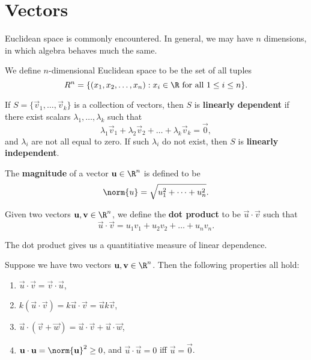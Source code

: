 \section{Vectors}
Euclidean space is commonly encountered. In general, we may have $n$ dimensions, in which algebra behaves much the same.
 \begin{definition}
  We define $n$-dimensional Euclidean space to be the set of all tuples \[
    R^n = \{(x_1, x_2, \dots, x_n) : x_i \in \R\ \text{for all}\ 1 \le i \le n\}
  .\] 
\end{definition}
\begin{definition}
  If $S = \{\vec{v}_1, \dots, \vec{v}_k\}$ is a collection of vectors, then $S$ is \textbf{linearly dependent} if there exist scalars $\lambda_1, \dots, \lambda_k$ such that \[
    \lambda_1 \vec{v}_1 + \lambda_2 \vec{v}_2 + \dots + \lambda_k \vec{v}_k = \vec{0}
  ,\] and $\lambda_i$ are not all equal to zero. If such  $\lambda_i$ do not exist, then  $S$ is \textbf{linearly independent}.
\end{definition}
\begin{definition}
  The \textbf{magnitude} of a vector $\vec{u} \in \R^n$ is defined to be \[
    \norm{u} = \sqrt{u_1^2 + \dots + u_n^2} 
  .\] 
\end{definition}
\begin{definition}
  Given two vectors $\vec{u}, \vec{v} \in \R^n$, we define the \textbf{dot product} to be $\vec{u}\cdot \vec{v}$ such that \[
    \vec{u}\cdot \vec{v} = u_1v_1 + u_2v_2 + \dots + u_n v_n
  .\] 
\end{definition}
\begin{remark}
  The dot product gives us a quantitiative measure of linear dependence.
\end{remark}
\begin{theorem}
  Suppose we have two vectors $\vec{u}, \vec{v} \in \R^n$. Then the following properties all hold:
  \begin{enumerate}
    \item $\vec{u}\cdot \vec{v} = \vec{v}\cdot \vec{u}$,
    \item $k(\vec{u} \cdot \vec{v}) = k \vec{u} \cdot \vec{v} = \vec{u} k \vec{v}$,
    \item $\vec{u}\cdot (\vec{v} + \vec{w}) = \vec{u}\cdot \vec{v} + \vec{u}\cdot \vec{w}$,
    \item $\vec{u}\cdot \vec{u} = \norm{\vec{u}}^2 \ge 0$, and $\vec{u}\cdot \vec{u} = 0$ iff $\vec{u} = \vec{0}$.
  \end{enumerate}
\end{theorem}
